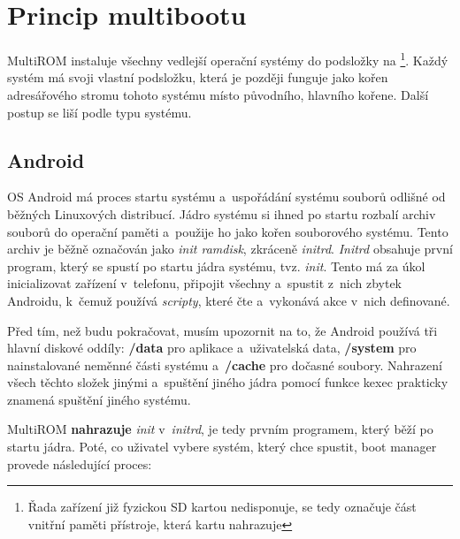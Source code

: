 \documentclass[12pt, a4paper, oneside]{article}
\newcommand{\B}{\textbf} %
\newcommand{\It}{\textit}  %
\begin{document}
\newpage
\section {Princip multibootu}
\label{princip-multibootu}
MultiROM instaluje všechny vedlejší operační systémy do podsložky na \footnote{Řada zařízení již fyzickou SD kartou nedisponuje,  se tedy označuje část vnitřní paměti přístroje, která kartu nahrazuje}. Každý systém má svoji vlastní podsložku, která je později funguje jako kořen adresářového stromu tohoto systému místo původního, hlavního kořene. Další postup se liší podle typu systému.

\subsection{Android}
OS Android má proces startu systému a~uspořádání systému souborů odlišné od běžných Linuxových distribucí. Jádro systému si ihned po startu rozbalí archiv souborů do operační paměti a~použije ho jako kořen souborového systému. Tento archiv je běžně označován jako \It{init ramdisk}, zkráceně \It{initrd}. \It{Initrd} obsahuje první program, který se spustí po startu jádra systému, tvz. \It{init}. Tento má za úkol inicializovat zařízení v~telefonu, připojit všechny  a~spustit z~nich zbytek Androidu, k~čemuž používá \It{scripty}, které čte a~vykonává akce v~nich definované.

Před tím, než budu pokračovat, musím upozornit na to, že Android používá tři hlavní diskové oddíly: \B{/data} pro aplikace a~uživatelská data, \B{/system} pro nainstalované neměnné části systému a~\B{/cache} pro dočasné soubory. Nahrazení všech těchto složek jinými a~spuštění jiného jádra pomocí funkce kexec prakticky znamená spuštění jiného systému.

MultiROM \B{nahrazuje} \It{init} v~\It{initrd}, je tedy prvním programem, který běží po startu jádra. Poté, co uživatel vybere systém, který chce spustit, boot manager provede následující proces:
\end{document}
